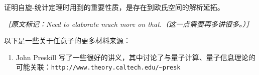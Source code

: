 \begin{remark}[自旋-统计定理]
证明自旋-统计定理时用到的重要性质，是存在到欧氏空间的解析延拓。
\end{remark}
{\small\itshape ［原文标记：Need to elaborate much more on that.（这一点需要再多讲很多。）］}

以下是一些关于任意子的更多材料来源：

\begin{enumerate}
  \item John Preskill 写了一些很好的讲义，其中讨论了与量子计算、量子信息理论的可能关联：\texttt{http://www.theory.caltech.edu/\textasciitilde presk}
\end{enumerate}
